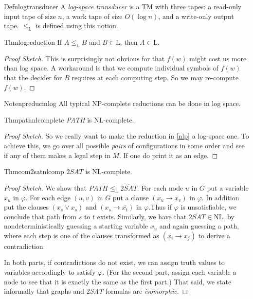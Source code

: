 \begin{reference}{Defn}{logtransducer}
  A \emph{log-space transducer} is a TM with three tapes: a read-only input tape of size $n$, a work tape of size $O(\log n)$, and a write-only output tape. $\leq_{\mathrm{L}}$ is defined using this notion.
\end{reference}

\begin{reference}{Thm}{logreduction}
  If $A\leq_{\mathrm{L}}B$ and $B\in \mathrm{L}$, then $A\in \mathrm{L}$.
\end{reference}

\begin{proof}[Proof Sketch]
  This is surprisingly not obvious for that $f(w)$ might cost us more than log space. A workaround is that we compute individual symbols of $f(w)$ that the decider for $B$ requires at each computing step. So we may re-compute $f(w)$.
\end{proof}

\begin{reference}{Note}{npreducinlog}
  All typical NP-complete reductions can be done in log space.
\end{reference}

\begin{reference}{Thm}{pathnlcomplete}
  \textit{PATH} is NL-complete.
\end{reference}

\begin{proof}[Proof Sketch]
  So we really want to make the reduction in \ref{nlp} a log-space one. To achieve this, we go over all possible \textit{pairs} of configurations in some order and see if any of them makes a legal step in $M$. If one do print it as an edge.
\end{proof}

\begin{reference}{Thm}{com2satnlcomp}
  $\overline{2 \textit{SAT}}$ is NL-complete.
\end{reference}

\begin{proof}[Proof Sketch]
  We show that $\textit{PATH}\leq_{\mathrm{L}}\overline{2 \textit{SAT}}$. For each node $u$ in $G$ put a variable $x_u$ in $\varphi$. For each edge $(u,v)$ in $G$ put a clause $(x_u\to x_v)$ in $\varphi$. In addition put the clauses $(x_s\vee x_s)$ and $(x_s\to \overline{x_t})$ in $\varphi$.Thus if $\varphi$ is unsatisfiable, we conclude that path from $s$ to $t$ exists. Similarly, we have that $\overline{2 \textit{SAT}}\in \mathrm{NL}$, by nondeterministically guessing a starting variable $x_u$ and again guessing a path, where each step is one of the clauses transformed as $(x_i\to x_j)$ to derive a contradiction.

  In both parts, if contradictions do not exist, we can assign truth values to variables accordingly to satisfy $\varphi$. (For the second part, assign each variable a node to see that it is exactly the same as the first part.) That said, we state informally that graphs and 2\textit{SAT} formulas are \textit{isomorphic}.
\end{proof}

